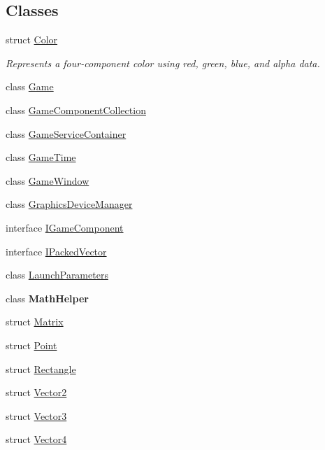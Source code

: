 \subsection*{Classes}
\begin{DoxyCompactItemize}
\item 
struct \hyperlink{struct_microsoft_1_1_xna_1_1_framework_1_1_color}{Color}
\begin{DoxyCompactList}\small\item\em Represents a four-\/component color using red, green, blue, and alpha data.\end{DoxyCompactList}\item 
class \hyperlink{class_microsoft_1_1_xna_1_1_framework_1_1_game}{Game}
\item 
class \hyperlink{class_microsoft_1_1_xna_1_1_framework_1_1_game_component_collection}{Game\+Component\+Collection}
\item 
class \hyperlink{class_microsoft_1_1_xna_1_1_framework_1_1_game_service_container}{Game\+Service\+Container}
\item 
class \hyperlink{class_microsoft_1_1_xna_1_1_framework_1_1_game_time}{Game\+Time}
\item 
class \hyperlink{class_microsoft_1_1_xna_1_1_framework_1_1_game_window}{Game\+Window}
\item 
class \hyperlink{class_microsoft_1_1_xna_1_1_framework_1_1_graphics_device_manager}{Graphics\+Device\+Manager}
\item 
interface \hyperlink{interface_microsoft_1_1_xna_1_1_framework_1_1_i_game_component}{I\+Game\+Component}
\item 
interface \hyperlink{interface_microsoft_1_1_xna_1_1_framework_1_1_i_packed_vector}{I\+Packed\+Vector}
\item 
class \hyperlink{class_microsoft_1_1_xna_1_1_framework_1_1_launch_parameters}{Launch\+Parameters}
\item 
class {\bfseries Math\+Helper}
\item 
struct \hyperlink{struct_microsoft_1_1_xna_1_1_framework_1_1_matrix}{Matrix}
\item 
struct \hyperlink{struct_microsoft_1_1_xna_1_1_framework_1_1_point}{Point}
\item 
struct \hyperlink{struct_microsoft_1_1_xna_1_1_framework_1_1_rectangle}{Rectangle}
\item 
struct \hyperlink{struct_microsoft_1_1_xna_1_1_framework_1_1_vector2}{Vector2}
\item 
struct \hyperlink{struct_microsoft_1_1_xna_1_1_framework_1_1_vector3}{Vector3}
\item 
struct \hyperlink{struct_microsoft_1_1_xna_1_1_framework_1_1_vector4}{Vector4}
\end{DoxyCompactItemize}
